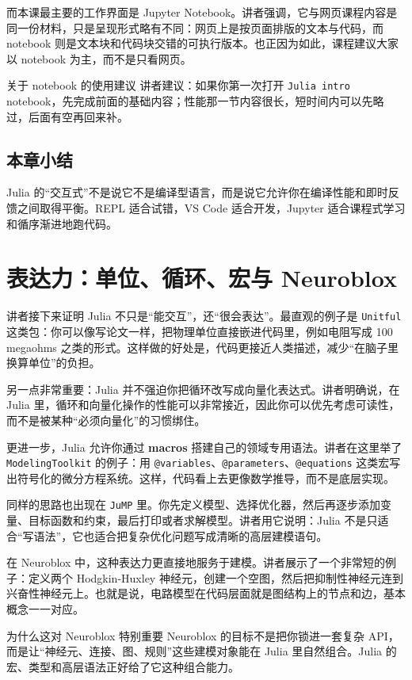 \documentclass[a4paper]{article}
\begin{document}
而本课最主要的工作界面是 Jupyter Notebook。讲者强调，它与网页课程内容是同一份材料，只是呈现形式略有不同：网页上是按页面排版的文本与代码，而 notebook 则是文本块和代码块交错的可执行版本。也正因为如此，课程建议大家以 notebook 为主，而不是只看网页。

\begin{warningbox}{关于 notebook 的使用建议}
讲者建议：如果你第一次打开 \texttt{Julia intro} notebook，先完成前面的基础内容；性能那一节内容很长，短时间内可以先略过，后面有空再回来补。
\end{warningbox}

\subsection{本章小结}
Julia 的“交互式”不是说它不是编译型语言，而是说它允许你在编译性能和即时反馈之间取得平衡。REPL 适合试错，VS Code 适合开发，Jupyter 适合课程式学习和循序渐进地跑代码。

\section{表达力：单位、循环、宏与 Neuroblox}
讲者接下来证明 Julia 不只是“能交互”，还“很会表达”。最直观的例子是 \texttt{Unitful} 这类包：你可以像写论文一样，把物理单位直接嵌进代码里，例如电阻写成 100 megaohms 之类的形式。这样做的好处是，代码更接近人类描述，减少“在脑子里换算单位”的负担。

另一点非常重要：Julia 并不强迫你把循环改写成向量化表达式。讲者明确说，在 Julia 里，循环和向量化操作的性能可以非常接近，因此你可以优先考虑可读性，而不是被某种“必须向量化”的习惯绑住。

更进一步，Julia 允许你通过 \textbf{macros} 搭建自己的领域专用语法。讲者在这里举了 \texttt{ModelingToolkit} 的例子：用 \texttt{@variables}、\texttt{@parameters}、\texttt{@equations} 这类宏写出符号化的微分方程系统。这样，代码看上去更像数学推导，而不是底层实现。

同样的思路也出现在 \texttt{JuMP} 里。你先定义模型、选择优化器，然后再逐步添加变量、目标函数和约束，最后打印或者求解模型。讲者用它说明：Julia 不是只适合“写语法”，它也适合把复杂优化问题写成清晰的高层建模语句。

在 Neuroblox 中，这种表达力更直接地服务于建模。讲者展示了一个非常短的例子：定义两个 Hodgkin-Huxley 神经元，创建一个空图，然后把抑制性神经元连到兴奋性神经元上。也就是说，电路模型在代码层面就是图结构上的节点和边，基本概念一一对应。

\begin{knowledgebox}{为什么这对 Neuroblox 特别重要}
Neuroblox 的目标不是把你锁进一套复杂 API，而是让“神经元、连接、图、规则”这些建模对象能在 Julia 里自然组合。Julia 的宏、类型和高层语法正好给了它这种组合能力。
\end{knowledgebox}
\end{document}
